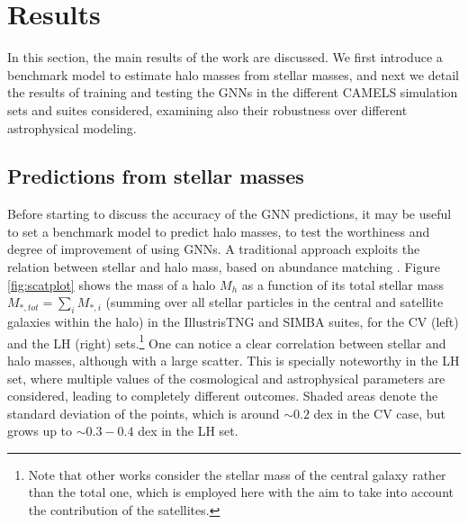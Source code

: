\documentclass[twocolumn]{aastex631}
\begin{document}
\section{Results}
\label{sec:results}

In this section, the main results of the work are discussed. We first introduce a benchmark model to estimate halo masses from stellar masses, and next we detail the results of training and testing the GNNs in the different CAMELS simulation sets and suites considered, examining also their robustness over different astrophysical modeling.


\subsection{Predictions from stellar masses}
\label{sec:benchmark}



Before starting to discuss the accuracy of the GNN predictions, it may be useful to set a benchmark model to predict halo masses, to test the worthiness and degree of improvement of using GNNs. A traditional approach exploits the relation between stellar and halo mass, based on abundance matching \citep{2010ApJ...717..379B, 2018ARA&A..56..435W}. Figure \ref{fig:scatplot} shows the mass of a halo $M_h$ as a function of its total stellar mass $M_{*,tot}=\sum_i M_{*,i}$ (summing over all stellar particles in the central and satellite galaxies within the halo) in the IllustrisTNG and SIMBA suites, for the CV (left) and the LH (right) sets.\footnote{Note that other works consider the stellar mass of the central galaxy rather than the total one, which is employed here with the aim to take into account the contribution of the satellites.} One can notice a clear correlation between stellar and halo masses, although with a large scatter. This is specially noteworthy in the LH set, where multiple values of the cosmological and astrophysical parameters are considered, leading to completely different outcomes. Shaded areas denote the standard deviation of the points, which is around $\sim 0.2$ dex in the CV case, but grows up to $\sim 0.3-0.4$ dex in the LH set. 
\end{document}
